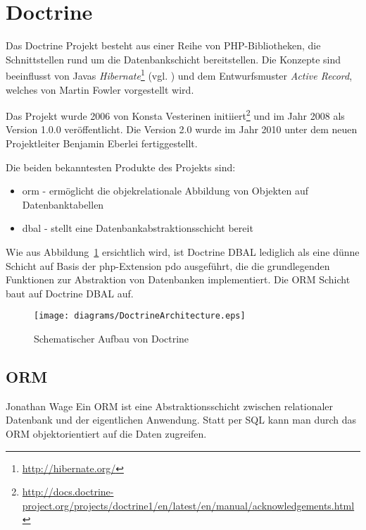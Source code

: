 \section{Doctrine}
\label{basics:sec:doctrine}
Das Doctrine Projekt besteht aus einer Reihe von PHP-Bibliotheken, die Schnittstellen rund um die Datenbankschicht bereitstellen. Die Konzepte sind beeinflusst von Javas \textit{Hibernate}\footnote{\url{http://hibernate.org/}} (vgl. \cite{web:t3nDoctrine2009}) und dem Entwurfsmuster \textit{Active Record}, welches von Martin Fowler \cite{book:fowlerPatterns2003} vorgestellt wird.

Das Projekt wurde 2006 von Konsta Vesterinen initiiert\footnote{\url{http://docs.doctrine-project.org/projects/doctrine1/en/latest/en/manual/acknowledgements.html}} und im Jahr 2008 als Version 1.0.0 veröffentlicht. Die Version 2.0 wurde im Jahr 2010 unter dem neuen Projektleiter Benjamin Eberlei fertiggestellt.

Die beiden bekanntesten Produkte des Projekts sind:
\begin{itemize}
	\item \gls{orm} - ermöglicht die objekrelationale Abbildung von Objekten auf Datenbanktabellen
	\item \gls{dbal} - stellt eine Datenbankabstraktionsschicht bereit
\end{itemize}

Wie aus Abbildung~\ref{fig:doctrineArchitecture} ersichtlich wird, ist Doctrine DBAL lediglich als eine dünne Schicht auf Basis der \gls{php}-Extension \gls{pdo} ausgeführt, die die grundlegenden Funktionen zur Abstraktion von Datenbanken implementiert. Die ORM Schicht baut auf Doctrine DBAL auf.

\begin{figure}[H]
    \centering
    \texttt{[image: diagrams/DoctrineArchitecture.eps]}
    \caption{Schematischer Aufbau von Doctrine}
    \label{fig:doctrineArchitecture}
\end{figure}

\subsection{ORM}
\label{basics:doctrine:subsec:orm}
\begin{shadequote}[l]{Jonathan Wage \cite{web:t3nDoctrine2009}}
	Ein ORM ist eine Abstraktionsschicht zwischen relationaler Datenbank und der eigentlichen Anwendung. Statt per SQL kann man durch das ORM objektorientiert auf die Daten zugreifen.
\end{shadequote}

